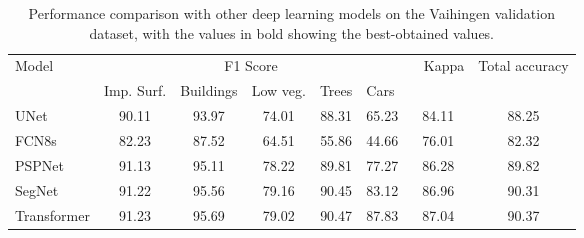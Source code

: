 \documentclass[journal]{IEEEtran}
\begin{document}
\begin{table*}
\renewcommand{\arraystretch}{1.25}
\caption{Performance comparison with other deep learning models on the Vaihingen validation dataset, with the values in bold showing the best-obtained values.}
\centering

\begin{tabular}{lccccccc} 
\hline
\multirow{2}{*}{Model}           & \multicolumn{5}{c}{F1 Score}                                                                                                                         & \multicolumn{1}{l}{\multirow{2}{*}{~
  Kappa}} & \multicolumn{1}{l}{\multirow{2}{*}{Total
  accuracy}}  \\ 
\cline{2-6}
                                 & \multicolumn{1}{l}{Imp. Surf.} & \multicolumn{1}{l}{Buildings} & \multicolumn{1}{l}{Low veg.} & \multicolumn{1}{l}{Trees} & \multicolumn{1}{l}{Cars} & \multicolumn{1}{l}{}                           & \multicolumn{1}{l}{}                                   \\ 
\hline
UNet                             & 90.11                          & 93.97                         & 74.01                        & 88.31                     & 65.23                    & 84.11                                          & 88.25                                                  \\
FCN8s                            & 82.23                          & 87.52                         & 64.51                        & 55.86                     & 44.66                    & 76.01                                          & 82.32                                                  \\
PSPNet                           & 91.13                          & 95.11                         & 78.22                        & 89.81                     & 77.27                    & 86.28                                          & 89.82                                                  \\
SegNet                           & 91.22                          & 95.56                         & 79.16                        & 90.45                     & 83.12                    & 86.96                                          & 90.31                                                  \\
Transformer                      & 91.23                          & 95.69                         & 79.02                        & 90.47                     & 87.83                    & 87.04                                          & 90.37                                                  \\

\end{tabular}
\end{table*}
\end{document}
